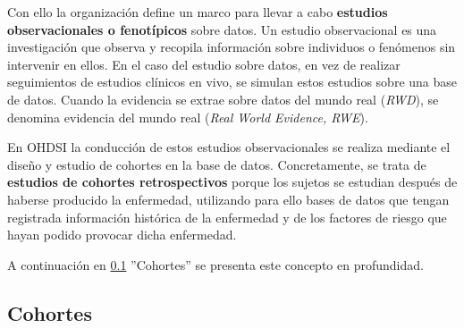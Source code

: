 
Con ello la organización define un marco para llevar a cabo \textbf{estudios observacionales o fenotípicos} sobre datos. Un estudio observacional es una investigación que observa y recopila información sobre individuos o fenómenos sin intervenir en ellos.
En el caso del estudio sobre datos, en vez de realizar seguimientos de estudios clínicos en vivo, se simulan estos estudios sobre una base de datos. Cuando la evidencia se extrae sobre datos del mundo real (\textit{RWD}), se denomina evidencia del mundo real (\textit{Real World Evidence, RWE}). 

En OHDSI la conducción de estos estudios observacionales se realiza mediante el diseño y estudio de cohortes en la base de datos. Concretamente, se trata de \textbf{estudios de cohortes retrospectivos} porque los sujetos se estudian después de haberse producido la enfermedad, utilizando para ello bases de datos que tengan registrada información histórica de la enfermedad y de los factores de riesgo que hayan podido provocar dicha enfermedad.

A continuación en \ref{subsec:05cohortes} ''Cohortes'' se presenta este concepto en profundidad.



\subsection{Cohortes} \label{subsec:05cohortes}

